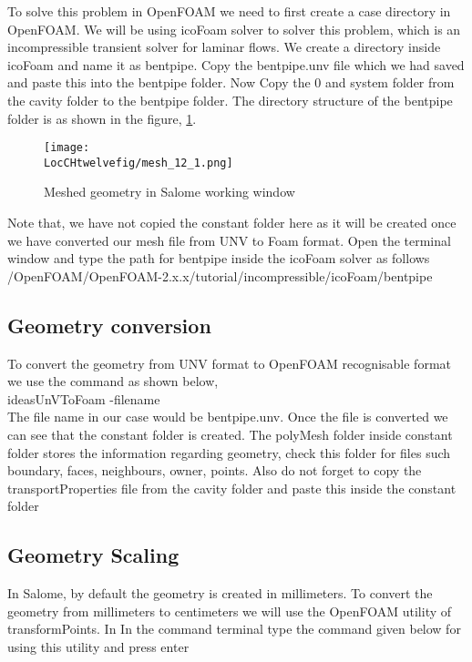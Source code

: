 To solve this problem in OpenFOAM we need to first create a case directory in OpenFOAM. We will be using icoFoam solver to solver this problem, which is an incompressible transient solver for laminar flows. We create a directory inside icoFoam and name it as bentpipe. Copy the bentpipe.unv file which we had saved and paste this into the bentpipe folder. Now Copy the 0 and system folder from the cavity folder to the bentpipe folder. The directory structure of the bentpipe folder is as shown in the figure, \ref{mesh_1}.

\begin{figure}[h]  
\centering
\texttt{[image: \\LocCHtwelvefig/mesh\_12\_1.png]}
\caption{Meshed geometry in Salome working window}
\label{mesh_1}
\end{figure}

Note that, we have not copied the constant folder here as it will be created once we have converted our mesh file from UNV to Foam format. Open the terminal window and type the path for bentpipe inside the icoFoam solver as follows \\
/OpenFOAM/OpenFOAM-2.x.x/tutorial/incompressible/icoFoam/bentpipe \\

\subsection{Geometry conversion}

To convert the geometry from UNV format to OpenFOAM recognisable format we use the command as shown below, \\

ideasUnVToFoam -filename \\

The file name in our case would be bentpipe.unv. Once the file is converted we can see that the constant folder is created. The polyMesh folder inside constant folder stores the information regarding geometry, check this folder for files such boundary, faces, neighbours, owner, points. Also do not forget to copy the transportProperties file from the cavity folder and paste this inside the constant folder

\subsection{Geometry Scaling}     

In Salome, by default the geometry is created in millimeters. To convert the geometry from millimeters to centimeters we will use the OpenFOAM utility of transformPoints. In In the command terminal type  the command given below for using this utility and press enter\\

